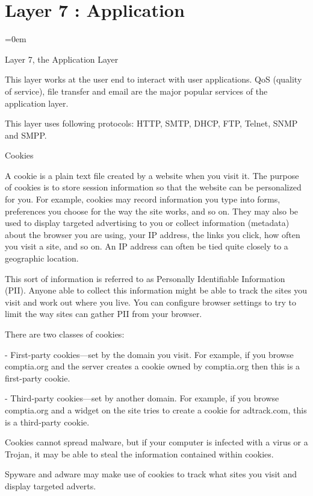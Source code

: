 
\section{Layer 7 : Application}
\label{sec:layer_7_application}
\parindent=0em

Layer 7, the Application Layer

This layer works at the user end to interact with user applications. QoS (quality of service), file transfer and email are the major popular services of the application layer.

This layer uses following protocols: HTTP, SMTP, DHCP, FTP, Telnet, SNMP and SMPP.

Cookies

A cookie is a plain text file created by a website when you visit it. The purpose of cookies is to store session information so that the website can be personalized for you. For example, cookies may record information you type into forms, preferences you choose for the way the site works, and so on. They may also be used to display targeted advertising to you or collect information (metadata) about the browser you are using, your IP address, the links you click, how often you visit a site, and so on. An IP address can often be tied quite closely to a geographic location.

This sort of information is referred to as Personally Identifiable Information (PII). Anyone able to collect this information might be able to track the sites you visit and work out where you live. You can configure browser settings to try to limit the way sites can gather PII from your browser.

There are two classes of cookies:

- First-party cookies—set by the domain you visit. For example, if you browse comptia.org and the server creates a cookie owned by comptia.org then this is a first-party cookie.

- Third-party cookies—set by another domain. For example, if you browse comptia.org and a widget on the site tries to create a cookie for adtrack.com, this is a third-party cookie. 

Cookies cannot spread malware, but if your computer is infected with a virus or a Trojan, it may be able to steal the information contained within cookies. 

Spyware and adware may make use of cookies to track what sites you visit and
display targeted adverts.


